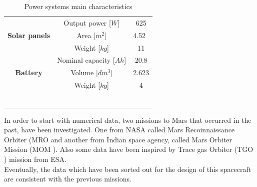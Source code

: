 \documentclass[a4paper, oneside, 11pt]{article}
\begin{document}
\begin{table}[h]
\centering
\caption{Power systems main characteristics}
\label{PS_charact}
\begin{tabular}{ccc}
\hline
\multicolumn{1}{|c|}{\multirow{3}{*}{\textbf{Solar panels}}} & \multicolumn{1}{c|}{Output power [$W$]}     & \multicolumn{1}{c|}{625}   \\  
\multicolumn{1}{|c|}{}                                       & \multicolumn{1}{c|}{Area [$m^{2}$]}             & \multicolumn{1}{l|}{4.52}  \\ 
\multicolumn{1}{|c|}{}                                       & \multicolumn{1}{c|}{Weight [$kg$]}           & \multicolumn{1}{c|}{11}  \\ \hline
\multicolumn{1}{|c|}{\multirow{3}{*}{\textbf{Battery}}}      & \multicolumn{1}{c|}{Nominal capacity [$Ah$]} & \multicolumn{1}{c|}{20.8}  \\  
\multicolumn{1}{|c|}{}                                       & \multicolumn{1}{c|}{Volume [$dm^{3}$]}           & \multicolumn{1}{c|}{2.623} \\  
\multicolumn{1}{|c|}{}                                       & \multicolumn{1}{c|}{Weight [$kg$]}           & \multicolumn{1}{c|}{4}     \\ \hline
\multirow{2}{*}{}                                            &                                       &                            \\
                                                             &                                       &                            \\
\multirow{2}{*}{}                                            &                                       &                            \\
                                                             &                                       & \multicolumn{1}{l}{}       \\
\textbf{}                                                    &                                       & \multicolumn{1}{l}{}       \\
\multicolumn{1}{l}{}                                         & \multicolumn{1}{l}{}                  & \multicolumn{1}{l}{}      
\end{tabular}
\end{table}

In order to start with numerical data, two missions to Mars that occurred in the past, have been investigated. One from NASA called Mars Recoinnaissance Orbiter (MRO \cite{PaperMRO} and another from Indian space agency, called Mars Orbiter Mission (MOM \cite{MOM}). Also some data have been inspired by Trace gas Orbiter (TGO \cite{TGO}) mission from ESA.\\
Eventually, the data which have been sorted out for the design of this spacecraft are consistent with the previous missions.
\end{document}
